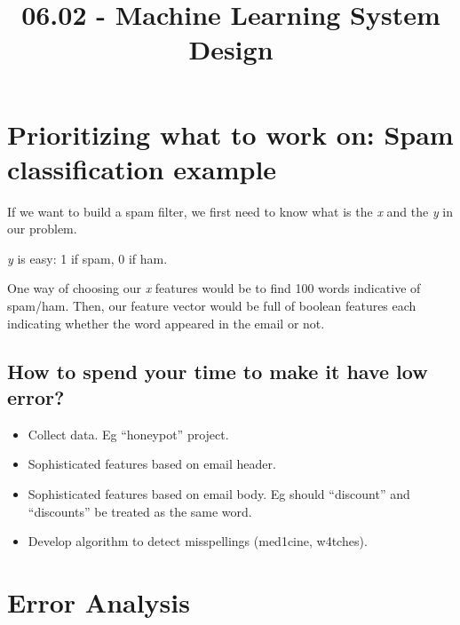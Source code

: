 \documentclass[11pt]{extarticle}
\begin{document}
 



\title{06.02 - Machine Learning System Design}

    
    \date{}
    

    

    \maketitle

\newpage





\section{Prioritizing what to work on: Spam classification
example}\label{prioritizing-what-to-work-on-spam-classification-example}

If we want to build a spam filter, we first need to know what is the
\emph{x} and the \emph{y} in our problem.

\emph{y} is easy: 1 if spam, 0 if ham.

One way of choosing our \emph{x} features would be to find 100 words
indicative of spam/ham. Then, our feature vector would be full of
boolean features each indicating whether the word appeared in the email
or not.

\subsection{How to spend your time to make it have low
error?}\label{how-to-spend-your-time-to-make-it-have-low-error}

\begin{itemize}
\itemsep1pt\parskip0pt
\item
  Collect data. Eg ``honeypot'' project.
\item
  Sophisticated features based on email header.
\item
  Sophisticated features based on email body. Eg should ``discount'' and
  ``discounts'' be treated as the same word.
\item
  Develop algorithm to detect misspellings (med1cine, w4tches).
\end{itemize}

\section{Error Analysis}\label{error-analysis}
\end{document}
